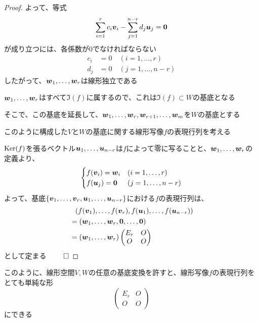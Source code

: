 \documentclass[../../../topic_linear-algebra]{subfiles}
\begin{document}
\begin{proof}
  よって、等式
  \begin{equation*}
    \sum_{i=1}^r c_i \vb*{v}_i - \sum_{j=1}^{n-r} d_j \vb*{u}_j = \vb*{0}
  \end{equation*}
  が成り立つには、各係数が0でなければならない
  \begin{align*}
    c_i & = 0 \quad (i = 1, \ldots, r)   \\
    d_j & = 0 \quad (j = 1, \ldots, n-r)
  \end{align*}
  したがって、$\vb*{w}_1,\ldots,\vb*{w}_r$は線形独立である

  \br

  $\vb*{w}_1,\ldots,\vb*{w}_r$はすべて$\Im(f)$に属するので、これは$\Im(f) \subset W$の基底となる

  そこで、この基底を延長して、$\vb*{w}_1,\ldots,\vb*{w}_r,\vb*{w}_{r+1},\ldots,\vb*{w}_m$を$W$の基底とする

  \br

  このように構成した$V$と$W$の基底に関する線形写像$f$の表現行列を考える

  $\operatorname{Ker}(f)$を張るベクトル$\vb*{u}_1,\ldots,\vb*{u}_{n-r}$は$f$によって零に写ることと、$\vb*{w}_1,\ldots,\vb*{w}_r$の定義より、
  \begin{equation*}
    \begin{cases}
      f(\vb*{v}_i) = \vb*{w}_i & (i = 1, \ldots, r)   \\
      f(\vb*{u}_j) = \vb*{0}   & (j = 1, \ldots, n-r)
    \end{cases}
  \end{equation*}
  よって、基底$\{ \vb*{v}_1,\ldots,\vb*{v}_r,\vb*{u}_1,\ldots,\vb*{u}_{n-r} \}$における$f$の表現行列は、
  \begin{align*}
     & \phantom{ = } (f(\vb*{v}_1), \ldots, f(\vb*{v}_r), f(\vb*{u}_1), \ldots, f(\vb*{u}_{n-r})) \\
     & = ( \vb*{w}_1, \ldots, \vb*{w}_r, \vb*{0}, \ldots, \vb*{0} )                               \\
     & = (\vb*{w}_1, \ldots, \vb*{w}_r) \begin{pmatrix}
                                          E_r & O \\
                                          O   & O
                                        \end{pmatrix}
  \end{align*}
  として定まる $\qed$
\end{proof}

\br

このように、線形空間$V,W$の任意の基底変換を許すと、線形写像$f$の表現行列をとても単純な形
\begin{equation*}
  \begin{pmatrix}
    E_r & O \\
    O   & O
  \end{pmatrix}
\end{equation*}
にできる
\end{document}
